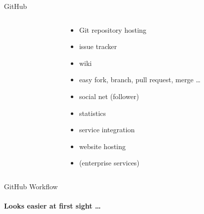 \documentclass{beamer}
\begin{document}
\begin{frame}{GitHub\textregistered}
    \begin{columns}[T]
        \begin{column}{0.4\textwidth}
            
        \end{column}
        \begin{column}{0.6\textwidth}
            \begin{itemize}
                \item Git repository hosting
                \item issue tracker
                \item wiki
                \item easy fork, branch, pull request, merge \dots
                \item social net (follower)
                \item statistics
                \item service integration
                \item website hosting
                \item (enterprise services)
            \end{itemize}
        \end{column}
    \end{columns}
\end{frame}

\begin{frame}{GitHub Workflow}
    \framesubtitle{Looks easier at first sight \dots}
    
\end{frame}
\end{document}
